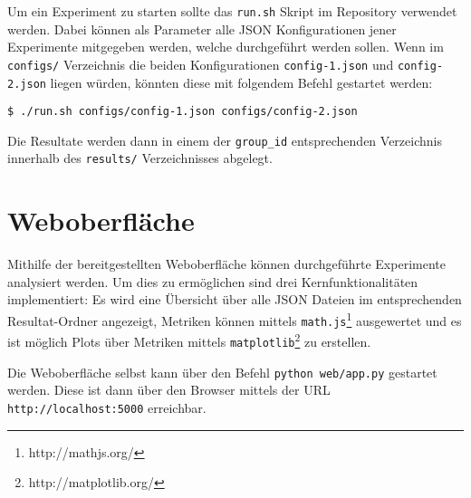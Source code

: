 Um ein Experiment zu starten sollte das \texttt{run.sh} Skript im Repository verwendet werden. Dabei können als Parameter alle JSON Konfigurationen jener Experimente mitgegeben werden, welche durchgeführt werden sollen. Wenn im \texttt{configs/} Verzeichnis die beiden Konfigurationen \texttt{config-1.json} und \texttt{config-2.json} liegen würden, könnten diese mit folgendem Befehl gestartet werden:

\begin{lstlisting}[frame=none]
$ ./run.sh configs/config-1.json configs/config-2.json
\end{lstlisting}

Die Resultate werden dann in einem der \texttt{group{\_}id} entsprechenden Verzeichnis innerhalb des \texttt{results/} Verzeichnisses abgelegt.

\section{Weboberfläche}
Mithilfe der bereitgestellten Weboberfläche können durchgeführte Experimente analysiert werden. Um dies zu ermöglichen sind drei Kernfunktionalitäten implementiert: Es wird eine Übersicht über alle JSON Dateien im entsprechenden Resultat-Ordner angezeigt, Metriken können mittels \texttt{math.js}\footnote{http://mathjs.org/} ausgewertet und es ist möglich Plots über Metriken mittels \texttt{matplotlib}\footnote{http://matplotlib.org/} zu erstellen.

Die Weboberfläche selbst kann über den Befehl \texttt{python web/app.py} gestartet werden. Diese ist dann über den Browser mittels der URL \texttt{http://localhost:5000} erreichbar.